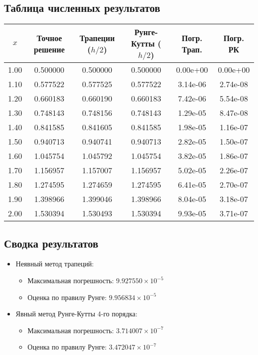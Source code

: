 \documentclass[12pt,a4paper]{article}
\begin{document}
\subsection{Таблица численных результатов}
\begin{center}
\begin{tabular}{cccccc}
\toprule
$x$ & Точное решение & Трапеции ($h/2$) & Рунге-Кутты ($h/2$) & Погр. Трап. & Погр. РК \\
\midrule
1.00 & 0.500000 & 0.500000 & 0.500000 & 0.00e+00 & 0.00e+00 \\
1.10 & 0.577522 & 0.577525 & 0.577522 & 3.14e-06 & 2.74e-08 \\
1.20 & 0.660183 & 0.660190 & 0.660183 & 7.42e-06 & 5.54e-08 \\
1.30 & 0.748143 & 0.748156 & 0.748143 & 1.29e-05 & 8.47e-08 \\
1.40 & 0.841585 & 0.841605 & 0.841585 & 1.98e-05 & 1.16e-07 \\
1.50 & 0.940713 & 0.940741 & 0.940713 & 2.82e-05 & 1.50e-07 \\
1.60 & 1.045754 & 1.045792 & 1.045754 & 3.82e-05 & 1.86e-07 \\
1.70 & 1.156957 & 1.157007 & 1.156957 & 5.02e-05 & 2.26e-07 \\
1.80 & 1.274595 & 1.274659 & 1.274595 & 6.41e-05 & 2.70e-07 \\
1.90 & 1.398966 & 1.399046 & 1.398966 & 8.04e-05 & 3.18e-07 \\
2.00 & 1.530394 & 1.530493 & 1.530394 & 9.93e-05 & 3.71e-07 \\
\bottomrule
\end{tabular}
\end{center}

\subsection{Сводка результатов}
\begin{itemize}
\item Неявный метод трапеций:
  \begin{itemize}
  \item Максимальная погрешность: $9.927550 \times 10^{-5}$
  \item Оценка по правилу Рунге: $9.956834 \times 10^{-5}$
  \end{itemize}
  
\item Явный метод Рунге-Кутты 4-го порядка:
  \begin{itemize}
  \item Максимальная погрешность: $3.714007 \times 10^{-7}$
  \item Оценка по правилу Рунге: $3.472047 \times 10^{-7}$
  \end{itemize}
\end{itemize}
\end{document}
